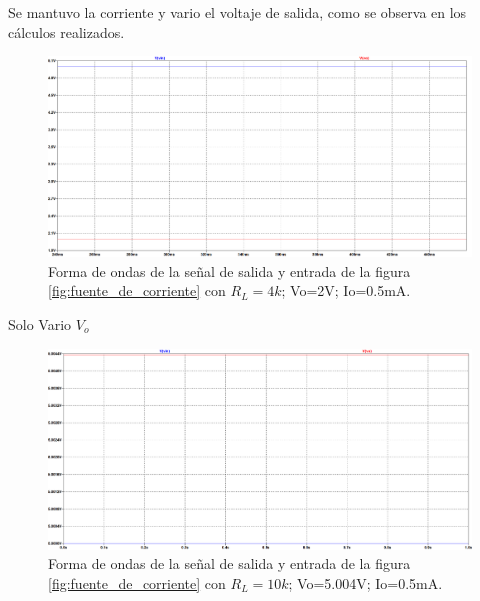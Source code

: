 \begin{enumerate}[label=\textbf{\arabic*.}, font=\bfseries]
\begin{itemize}
\begin{itemize}
                    Se mantuvo la corriente y vario el voltaje de salida, como se observa en los cálculos realizados.

                    \begin{figure}[H]
                      \centering
                      \renewcommand{\figurename}{Gráfica}
                      \includegraphics[width=\textwidth]{Imagenes/sim_fuente3.png}
                      \caption{Forma de ondas de la señal de salida y entrada de la figura \ref{fig:fuente_de_corriente} con $R_L=4k$; Vo=2V; Io=0.5mA.}
                      \label{fig:sim_fuente3}
                    \end{figure}

                    Solo Vario $V_o$

                    \begin{figure}[H]
                      \centering
                      \renewcommand{\figurename}{Gráfica}
                      \includegraphics[width=\textwidth]{Imagenes/sim_fuente4.png}
                      \caption{Forma de ondas de la señal de salida y entrada de la figura \ref{fig:fuente_de_corriente} con $R_L=10k$; Vo=5.004V; Io=0.5mA.}
                      \label{fig:sim_fuente4}
                    \end{figure}


\end{itemize}
\end{itemize}
\end{enumerate}

